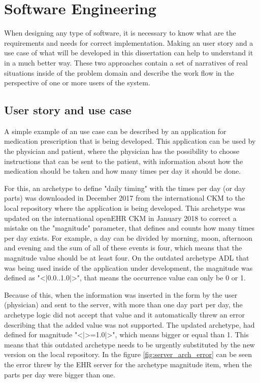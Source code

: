 \documentclass[mim_thesis.tex]{subfiles}
\begin{document}
\section{Software Engineering}
When designing any type of software, it is necessary to know what are the requirements and needs for correct implementation. Making an user story and a use case of what will be developed in this dissertation can help to understand it in a much better way. These two approaches contain a set of narratives of real situations inside of the problem domain and describe the work flow in the perspective of one or more users of the system.  

\subsection{User story and use case}

A simple example of an use case can be described by an application for medication prescription that is being developed. This application can be used by the physician and patient, where the physician has the possibility to choose instructions that can be sent to the patient, with information about how the medication should be taken and how many times per day it should be done. 

For this, an archetype to define "daily timing" with the times per day (or day parts) was downloaded in December 2017 from the international CKM to the local repository where the application is being developed. This archetype was updated on the international openEHR CKM in January 2018 to correct a mistake on the "magnitude" parameter, that defines and counts how many times per day exists. For example, a day can be divided by morning, moon, afternoon and evening and the sum of all of these events is four, which means that the magnitude value should be at least four. On the outdated archetype ADL that was being used inside of the application under development, the magnitude was defined as "<|0.0..1.0|>", that means the occurrence value can only be 0 or 1. 

Because of this, when the information was inserted in the form by the user (physician) and sent to the server, with more than one day part per day, the archetype logic did not accept that value and it automatically threw an error describing that the added value was not supported. The updated archetype, had defined for magnitude "<|>=1.0|>", which means bigger or equal than 1. This means that this outdated archetype needs to be urgently substituted by the new version on the local repository. In the figure \ref{fig:server_arch_error} can be seen the error threw by the EHR server for the archetype magnitude item, when the parts per day were bigger than one.
\end{document}
